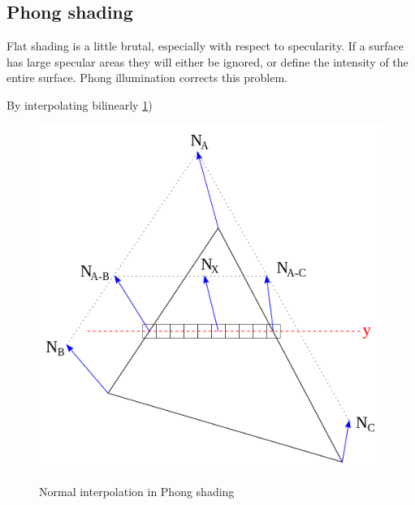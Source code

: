 \subsection{Phong shading}
Flat shading is a little brutal, especially with respect to specularity. If a
surface has large specular areas they will either be ignored, or define the
intensity of the entire surface. Phong illumination corrects this problem.

By interpolating bilinearly
\ref{fig:phongInterpo})

\begin{figure}
\includegraphics{pics/phongInterpol.png}
\label{fig:phongInterpo}
\caption{Normal interpolation in Phong shading}
\end{figure}
